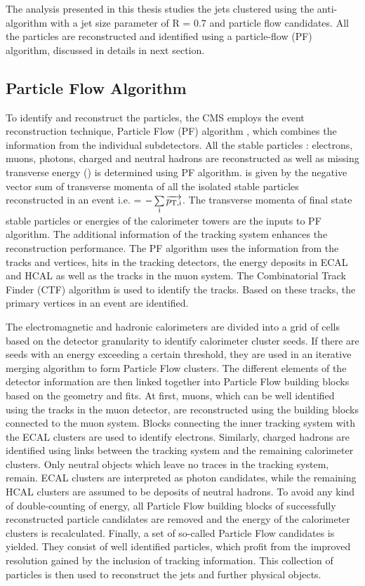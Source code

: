 The analysis presented in this thesis studies the jets clustered using the anti-\kt algorithm with a jet size parameter of R = 0.7 and particle flow candidates. All the particles are reconstructed and identified using a particle-flow (PF) algorithm, discussed in details in next section.

\subsection{Particle Flow Algorithm}
To identify and reconstruct the particles, the CMS employs the event reconstruction technique, Particle Flow (PF) algorithm \cite{CMS:2009nxa, CMS:2010byl}, which combines the information from the individual subdetectors. All the stable particles : electrons, muons, photons, charged and neutral hadrons are reconstructed as well as missing transverse energy (\ETmiss) is determined using PF algorithm. \ETmiss is given by the negative vector sum of transverse momenta \pt of all the isolated stable particles reconstructed in an event i.e. \ETmiss = $-\sum\limits_{\rm i}^{}\overrightarrow{p_{\rm T,i}}$. %
The transverse momenta of final state stable particles or energies of the calorimeter towers are the inputs to PF algorithm. The additional information of the tracking system enhances the reconstruction performance. The PF algorithm uses the information from the tracks and vertices, hits in the tracking detectors, the energy deposits in ECAL and HCAL as well as the tracks in the muon system. The Combinatorial Track Finder (CTF) algorithm \cite{Adam:2005cg} is used to identify the tracks. Based on these tracks, the primary vertices in an event are identified. 

The electromagnetic and hadronic calorimeters are divided into a grid of cells based on the detector granularity to identify calorimeter cluster seeds. If there are seeds with an energy exceeding a certain threshold, they are used in an iterative merging algorithm to form Particle Flow clusters. The different elements of the detector information are then linked together into Particle Flow building blocks based on the geometry and fits. At first, muons, which can be well identified using the tracks in the muon detector, are reconstructed using the building blocks connected to the muon system. Blocks connecting the inner tracking system with the ECAL clusters are used to identify electrons. Similarly, charged hadrons are identified using links between the tracking system and the remaining calorimeter clusters. Only neutral objects which leave no traces in the tracking system, remain. ECAL clusters are interpreted as photon candidates, while the remaining HCAL clusters are assumed to be deposits of neutral hadrons. To avoid any kind of double-counting of energy, all Particle Flow building blocks of successfully reconstructed particle candidates are removed and the energy of the calorimeter clusters is recalculated. Finally, a set of so-called Particle Flow candidates is yielded. They consist of well identified particles, which profit from the improved resolution gained by the inclusion of tracking information. This collection of particles is then used to reconstruct the jets and further physical objects.

